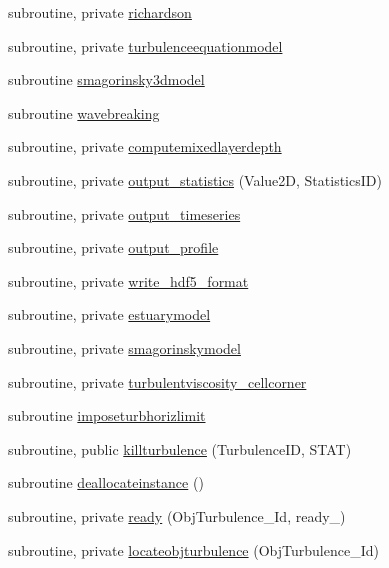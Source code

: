 \begin{DoxyCompactItemize}
\item 
subroutine, private \mbox{\hyperlink{namespacemoduleturbulence_aaa0e2c6e1a9ea1d07cb81974aeb2b1f8}{richardson}}
\item 
subroutine, private \mbox{\hyperlink{namespacemoduleturbulence_ab1caba5ca0b728449a98a3884fda59e8}{turbulenceequationmodel}}
\item 
subroutine \mbox{\hyperlink{namespacemoduleturbulence_ab31d00156edd7f09041fb314d6d0445a}{smagorinsky3dmodel}}
\item 
subroutine \mbox{\hyperlink{namespacemoduleturbulence_a60c4e6500b8bfaf5e8e8a202db2203ba}{wavebreaking}}
\item 
subroutine, private \mbox{\hyperlink{namespacemoduleturbulence_ad38c50749e5db481714069b7e366c4e7}{computemixedlayerdepth}}
\item 
subroutine, private \mbox{\hyperlink{namespacemoduleturbulence_a217345ed46e74ae2c1880a07108c9487}{output\+\_\+statistics}} (Value2D, Statistics\+ID)
\item 
subroutine, private \mbox{\hyperlink{namespacemoduleturbulence_ad434d19fe537a51091b39515c951a2a3}{output\+\_\+timeseries}}
\item 
subroutine, private \mbox{\hyperlink{namespacemoduleturbulence_a72996c619e984f58e135b17214de8718}{output\+\_\+profile}}
\item 
subroutine, private \mbox{\hyperlink{namespacemoduleturbulence_a256cd0709bb85cc0f9cd463e00938709}{write\+\_\+hdf5\+\_\+format}}
\item 
subroutine, private \mbox{\hyperlink{namespacemoduleturbulence_abcd63973fdc2c7e7d3ad23e011bee2d5}{estuarymodel}}
\item 
subroutine, private \mbox{\hyperlink{namespacemoduleturbulence_a80e74aea32fd0cd9fd8e273cb359791a}{smagorinskymodel}}
\item 
subroutine, private \mbox{\hyperlink{namespacemoduleturbulence_ab7894e5b2120544a23a97a5dec146823}{turbulentviscosity\+\_\+cellcorner}}
\item 
subroutine \mbox{\hyperlink{namespacemoduleturbulence_a350c5c3bf3571f6247e3278025c35a0c}{imposeturbhorizlimit}}
\item 
subroutine, public \mbox{\hyperlink{namespacemoduleturbulence_a16fdef89832180a7e41d6bd450c05746}{killturbulence}} (Turbulence\+ID, S\+T\+AT)
\item 
subroutine \mbox{\hyperlink{namespacemoduleturbulence_aad40d3e2593854d66c21ebbd92791ba0}{deallocateinstance}} ()
\item 
subroutine, private \mbox{\hyperlink{namespacemoduleturbulence_aee156286cd0fad2976b9e8c3c1d52ec6}{ready}} (Obj\+Turbulence\+\_\+\+Id, ready\+\_\+)
\item 
subroutine, private \mbox{\hyperlink{namespacemoduleturbulence_a36b249a1813247cecf28481893bc0ea2}{locateobjturbulence}} (Obj\+Turbulence\+\_\+\+Id)
\end{DoxyCompactItemize}
